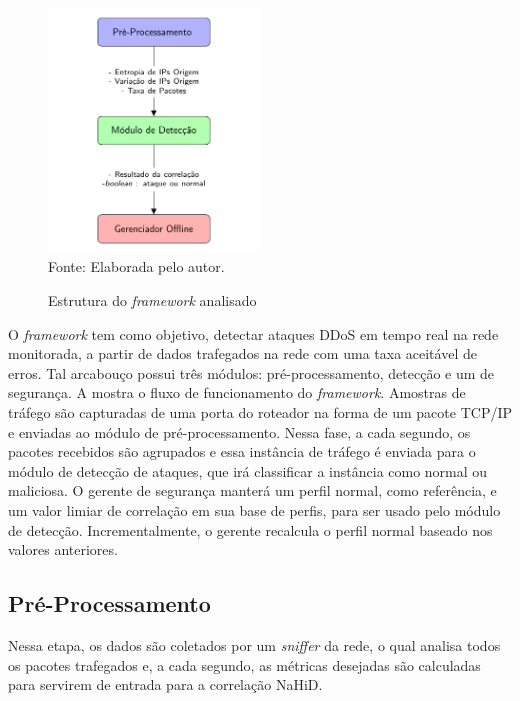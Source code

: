  \begin{figure}[ht]
	\centering
	\caption{Estrutura do \textit{framework} analisado }
	\includegraphics[width=0.5\textwidth]{figs/fluxoFramework.pdf}\\
	{Fonte: Elaborada pelo autor.}
	\label{fig:Fluxo_Framework}
\end{figure}

O \textit{framework} tem como objetivo, detectar ataques DDoS em tempo real na rede monitorada, a partir de dados trafegados na rede com uma taxa aceitável de erros. Tal arcabouço possui três módulos: pré-processamento, detecção e um de segurança. A  mostra o fluxo de funcionamento do \textit{framework}. Amostras de tráfego são capturadas de uma porta do roteador na forma de um pacote TCP/IP e enviadas ao módulo de pré-processamento. Nessa fase, a cada segundo, os pacotes recebidos são agrupados e essa instância de tráfego é enviada para o módulo de detecção de ataques, que irá classificar a instância como normal ou maliciosa. O gerente de segurança manterá um perfil normal, como referência, e um valor limiar de correlação em sua base de perfis, para ser usado pelo módulo de detecção. Incrementalmente, o gerente recalcula o perfil normal baseado nos valores anteriores. 

\subsection{Pré-Processamento}
Nessa etapa, os dados são coletados por um \textit{sniffer} da rede, o qual analisa todos os pacotes trafegados e, a cada segundo, as métricas desejadas são calculadas para servirem de entrada para a correlação NaHiD. 

